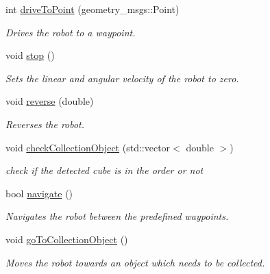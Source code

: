 \begin{DoxyCompactItemize}
int \hyperlink{class_navigator_a3395b9a8421320ae8910af858651a384}{drive\+To\+Point} (geometry\+\_\+msgs\+::\+Point)
\begin{DoxyCompactList}\small\item\em Drives the robot to a waypoint. \end{DoxyCompactList}\item 
void \hyperlink{class_navigator_aefba9b9c3ef40f77e2b998d56a870f2d}{stop} ()
\begin{DoxyCompactList}\small\item\em Sets the linear and angular velocity of the robot to zero. \end{DoxyCompactList}\item 
void \hyperlink{class_navigator_aeb0340cdf97f9bd06e3903d5a287cf4f}{reverse} (double)
\begin{DoxyCompactList}\small\item\em Reverses the robot. \end{DoxyCompactList}\item 
void \hyperlink{class_navigator_a7564ed301b924f2400b646612a52fb67}{check\+Collection\+Object} (std\+::vector$<$ double $>$)
\begin{DoxyCompactList}\small\item\em check if the detected cube is in the order or not \end{DoxyCompactList}\item 
bool \hyperlink{class_navigator_a31877b789e0075b41e61ee5cf02e836d}{navigate} ()
\begin{DoxyCompactList}\small\item\em Navigates the robot between the predefined waypoints. \end{DoxyCompactList}\item 
void \hyperlink{class_navigator_a8c3589733dc9aaf4109bddbee827f8eb}{go\+To\+Collection\+Object} ()
\begin{DoxyCompactList}\small\item\em Moves the robot towards an object which needs to be collected. \end{DoxyCompactList}\end{DoxyCompactItemize}
